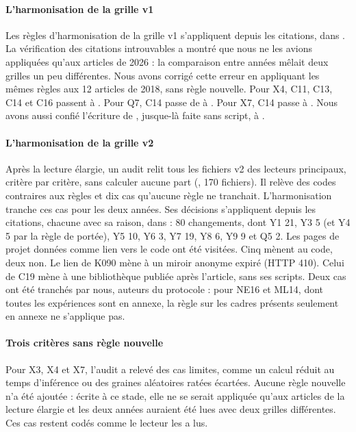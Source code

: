 \paragraph{L'harmonisation de la grille v1}
Les règles d'harmonisation de la grille v1 s'appliquent depuis les citations, dans
. La vérification des citations introuvables a montré que nous ne les
avions appliquées qu'aux articles de 2026 : la comparaison entre années mêlait deux grilles un peu
différentes. Nous avons corrigé cette erreur en appliquant les mêmes règles aux 12 articles de 2018,
sans règle nouvelle. Pour X4, C11, C13, C14 et C16 passent à . Pour Q7, C14 passe de
 à . Pour X7, C14 passe à . Nous avons aussi confié l'écriture de
, jusque-là faite sans script, à .

\paragraph{L'harmonisation de la grille v2}
Après la lecture élargie, un audit relit tous les fichiers v2 des lecteurs principaux, critère par
critère, sans calculer aucune part (, 170 fichiers). Il
relève des codes contraires aux règles et dix cas qu'aucune règle ne tranchait. L'harmonisation
tranche ces cas pour les deux années. Ses décisions s'appliquent
depuis les citations, chacune avec sa raison, dans  : 80 changements,
dont Y1 21, Y3 5 (et Y4 5 par la règle de portée), Y5 10, Y6 3, Y7 19, Y8 6, Y9 9 et Q5 2. Les pages
de projet données comme lien vers le code ont été visitées. Cinq mènent au code,
deux non. Le lien de K090 mène à un miroir anonyme expiré (HTTP 410). Celui de C19 mène à une
bibliothèque publiée après l'article, sans ses scripts. Deux cas ont été tranchés par nous, auteurs du
protocole : pour NE16 et ML14, dont toutes les expériences sont en annexe, la règle sur les cadres
présents seulement en annexe ne s'applique pas.

\paragraph{Trois critères sans règle nouvelle}
Pour X3, X4 et X7, l'audit a relevé des cas limites, comme un calcul réduit au temps d'inférence ou
des graines aléatoires ratées écartées. Aucune règle nouvelle n'a été ajoutée : écrite à ce stade, elle ne se serait appliquée qu'aux
articles de la lecture élargie et les deux années auraient été lues avec deux grilles différentes. Ces cas restent codés comme le lecteur les
a lus.

